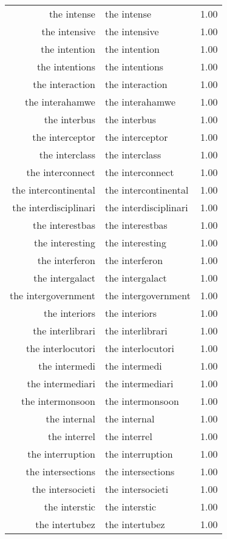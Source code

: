 \begin{table}[ht]
\begin{tabular}{rlr}
  the intense & the intense & 1.00 \\ 
  the intensive & the intensive & 1.00 \\ 
  the intention & the intention & 1.00 \\ 
  the intentions & the intentions & 1.00 \\ 
  the interaction & the interaction & 1.00 \\ 
  the interahamwe & the interahamwe & 1.00 \\ 
  the interbus & the interbus & 1.00 \\ 
  the interceptor & the interceptor & 1.00 \\ 
  the interclass & the interclass & 1.00 \\ 
  the interconnect & the interconnect & 1.00 \\ 
  the intercontinental & the intercontinental & 1.00 \\ 
  the interdisciplinari & the interdisciplinari & 1.00 \\ 
  the interestbas & the interestbas & 1.00 \\ 
  the interesting & the interesting & 1.00 \\ 
  the interferon & the interferon & 1.00 \\ 
  the intergalact & the intergalact & 1.00 \\ 
  the intergovernment & the intergovernment & 1.00 \\ 
  the interiors & the interiors & 1.00 \\ 
  the interlibrari & the interlibrari & 1.00 \\ 
  the interlocutori & the interlocutori & 1.00 \\ 
  the intermedi & the intermedi & 1.00 \\ 
  the intermediari & the intermediari & 1.00 \\ 
  the intermonsoon & the intermonsoon & 1.00 \\ 
  the internal & the internal & 1.00 \\ 
  the interrel & the interrel & 1.00 \\ 
  the interruption & the interruption & 1.00 \\ 
  the intersections & the intersections & 1.00 \\ 
  the intersocieti & the intersocieti & 1.00 \\ 
  the interstic & the interstic & 1.00 \\ 
  the intertubez & the intertubez & 1.00 \\ 

\end{tabular}
\end{table}
